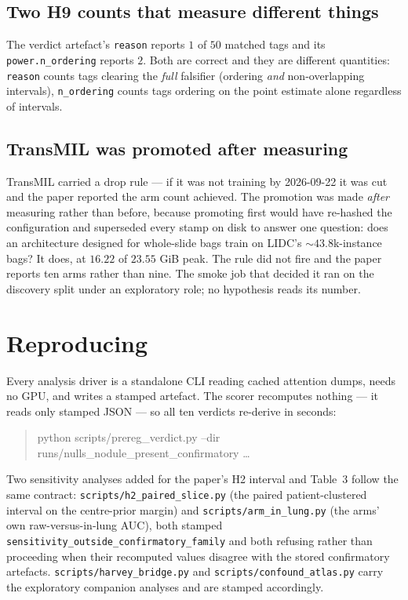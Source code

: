 \documentclass[10pt]{article}
\begin{document}
\subsection{Two H9 counts that measure different things}

The verdict artefact's \texttt{reason} reports $1$ of $50$ matched tags and its
\texttt{power.n\_ordering} reports $2$. Both are correct and they are different
quantities: \texttt{reason} counts tags clearing the \emph{full} falsifier
(ordering \emph{and} non-overlapping intervals), \texttt{n\_ordering} counts tags
ordering on the point estimate alone regardless of intervals.

\subsection{TransMIL was promoted after measuring}

TransMIL carried a drop rule --- if it was not training by 2026-09-22 it was cut
and the paper reported the arm count achieved. The promotion was made
\emph{after} measuring rather than before, because promoting first would have
re-hashed the configuration and superseded every stamp on disk to answer one
question: does an architecture designed for whole-slide bags train on LIDC's
${\sim}43.8$k-instance bags? It does, at $16.22$ of $23.55$ GiB peak. The rule did
not fire and the paper reports ten arms rather than nine. The smoke job that
decided it ran on the discovery split under an exploratory role; no hypothesis
reads its number.

\section{Reproducing}

Every analysis driver is a standalone CLI reading cached attention dumps, needs
no GPU, and writes a stamped artefact. The scorer recomputes nothing --- it reads
only stamped JSON --- so all ten verdicts re-derive in seconds:

\begin{quote}\small\ttfamily
python scripts/prereg\_verdict.py --dir runs/nulls\_nodule\_present\_confirmatory \ldots
\end{quote}

\noindent Two sensitivity analyses added for the paper's H2 interval and
Table~3 follow the same contract:
\texttt{scripts/h2\_paired\_slice.py} (the paired patient-clustered interval
on the centre-prior margin) and \texttt{scripts/arm\_in\_lung.py} (the arms'
own raw-versus-in-lung AUC), both stamped
\texttt{sensitivity\_outside\_confirmatory\_family} and both refusing rather
than proceeding when their recomputed values disagree with the stored
confirmatory artefacts. \texttt{scripts/harvey\_bridge.py} and
\texttt{scripts/confound\_atlas.py} carry the exploratory companion analyses
and are stamped accordingly.
\end{document}
